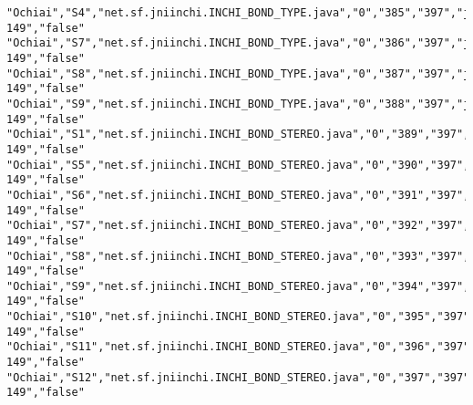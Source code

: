 \begin{lstlisting}
"Ochiai","S4","net.sf.jniinchi.INCHI_BOND_TYPE.java","0","385","397","jniinchi-149","false"
"Ochiai","S7","net.sf.jniinchi.INCHI_BOND_TYPE.java","0","386","397","jniinchi-149","false"
"Ochiai","S8","net.sf.jniinchi.INCHI_BOND_TYPE.java","0","387","397","jniinchi-149","false"
"Ochiai","S9","net.sf.jniinchi.INCHI_BOND_TYPE.java","0","388","397","jniinchi-149","false"
"Ochiai","S1","net.sf.jniinchi.INCHI_BOND_STEREO.java","0","389","397","jniinchi-149","false"
"Ochiai","S5","net.sf.jniinchi.INCHI_BOND_STEREO.java","0","390","397","jniinchi-149","false"
"Ochiai","S6","net.sf.jniinchi.INCHI_BOND_STEREO.java","0","391","397","jniinchi-149","false"
"Ochiai","S7","net.sf.jniinchi.INCHI_BOND_STEREO.java","0","392","397","jniinchi-149","false"
"Ochiai","S8","net.sf.jniinchi.INCHI_BOND_STEREO.java","0","393","397","jniinchi-149","false"
"Ochiai","S9","net.sf.jniinchi.INCHI_BOND_STEREO.java","0","394","397","jniinchi-149","false"
"Ochiai","S10","net.sf.jniinchi.INCHI_BOND_STEREO.java","0","395","397","jniinchi-149","false"
"Ochiai","S11","net.sf.jniinchi.INCHI_BOND_STEREO.java","0","396","397","jniinchi-149","false"
"Ochiai","S12","net.sf.jniinchi.INCHI_BOND_STEREO.java","0","397","397","jniinchi-149","false"
\end{lstlisting}
